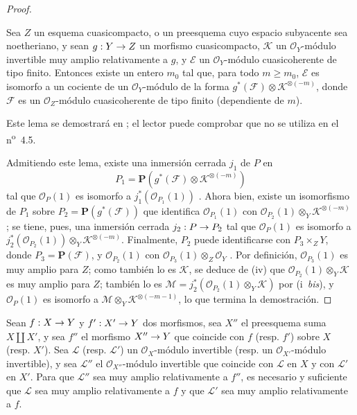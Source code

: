 \documentclass[oneside,10pt]{amsart}
\makeatletter
\renewcommand{\geq}{\geqslant}
\newcommand{\ega@arrow}[2]{\mathchoice{#1}{#2}{#2}{#2}}
\renewcommand{\to}{\ega@arrow{\longrightarrow}{\rightarrow}}
\newcommand{\oldpage}[2][]{\marginnote{\normalfont\footnotesize\textbf{#1}~|~#2}\ignorespaces}
\let\EGAOriginalLabel\label
\renewcommand{\label}[1]{\phantomsection\EGAOriginalLabel{#1}}
\makeatother
\begin{document}
\begin{proof}
\begin{lemma}[4.4.10.1]
\label{II.4.4.10.1-fr}
Sea $Z$ un esquema cuasicompacto, o un preesquema cuyo espacio subyacente sea noetheriano, y sean $g:Y\to Z$ un morfismo cuasicompacto, $\mathcal{K}$ un $\mathcal{O}_Y$-módulo invertible muy amplio relativamente a $g$, y $\mathcal{E}$ un $\mathcal{O}_Y$-módulo cuasicoherente de tipo finito.
Entonces existe un entero $m_0$ tal que, para todo $m\geq m_0$, $\mathcal{E}$ es isomorfo a un cociente de un $\mathcal{O}_Y$-módulo de la forma $g^*(\mathcal{F})\otimes\mathcal{K}^{\otimes(-m)}$, donde $\mathcal{F}$ es un $\mathcal{O}_Z$-módulo cuasicoherente de tipo finito (dependiente de $m$).
\end{lemma}

Este lema se demostrará en ;
el lector puede comprobar que  no se utiliza en el n\textsuperscript{o}~4.5.

\oldpage[II]{83}
Admitiendo este lema, existe una inmersión cerrada $j_1$ de $P$ en
\[
  P_1=\mathbf{P}(g^*(\mathcal{F})\otimes\mathcal{K}^{\otimes(-m)})
\]
tal que $\mathcal{O}_P(1)$ es isomorfo a $j_1^*(\mathcal{O}_{P_1}(1))$ .
Ahora bien, existe un isomorfismo de $P_1$ sobre $P_2=\mathbf{P}(g^*(\mathcal{F}))$ que identifica $\mathcal{O}_{P_1}(1)$ con $\mathcal{O}_{P_2}(1)\otimes_Y\mathcal{K}^{\otimes(-m)}$ ;
se tiene, pues, una inmersión cerrada $j_2:P\to P_2$ tal que $\mathcal{O}_P(1)$ es isomorfo a $j_2^*(\mathcal{O}_{P_2}(1))\otimes_Y\mathcal{K}^{\otimes(-m)}$.
Finalmente, $P_2$ puede identificarse con $P_3\times_ZY$, donde $P_3=\mathbf{P}(\mathcal{F})$, y $\mathcal{O}_{P_2}(1)$ con $\mathcal{O}_{P_3}(1)\otimes_Z\mathcal{O}_Y$ .
Por definición, $\mathcal{O}_{P_3}(1)$ es muy amplio para $Z$;
como también lo es $\mathcal{K}$, se deduce de (iv) que $\mathcal{O}_{P_2}(1)\otimes_Y\mathcal{K}$ es muy amplio para $Z$;
también lo es $\mathcal{M}=j_2^*(\mathcal{O}_{P_2}(1)\otimes_Y\mathcal{K})$ por (i~\emph{bis}), y $\mathcal{O}_P(1)$ es isomorfo a $\mathcal{M}\otimes_Y\mathcal{K}^{\otimes(-m-1)}$, lo que termina la demostración.
\end{proof}

\begin{proposition}[4.4.11]
\label{II.4.4.11-fr}
Sean $f:X\to Y$ y $f':X'\to Y$ dos morfismos, sea $X''$ el preesquema suma $X\amalg X'$, y sea $f''$ el morfismo $X''\to Y$ que coincide con $f$ \textup{(resp. $f'$)} sobre $X$ \textup{(resp. $X'$)}.
Sea $\mathcal{L}$ \textup{(resp. $\mathcal{L}'$)} un $\mathcal{O}_X$-módulo invertible \textup{(resp.} un $\mathcal{O}_{X'}$-módulo invertible\textup{)}, y sea $\mathcal{L}''$ el $\mathcal{O}_{X''}$-módulo invertible que coincide con $\mathcal{L}$ en $X$ y con $\mathcal{L}'$ en $X'$.
Para que $\mathcal{L}''$ sea muy amplio relativamente a $f''$, es necesario y suficiente que $\mathcal{L}$ sea muy amplio relativamente a $f$ y que $\mathcal{L}'$ sea muy amplio relativamente a $f$.
\end{proposition}
\end{document}
